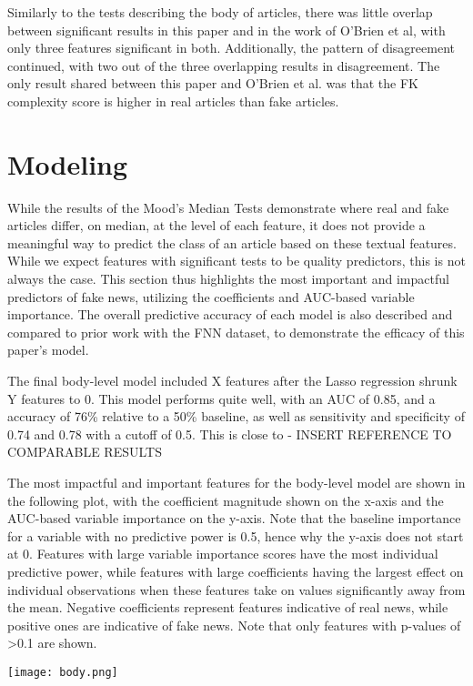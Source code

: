 \documentclass[../thesis.tex]{subfiles}
\begin{document}
Similarly to the tests describing the body of articles, there was little overlap between significant results in this paper and in the work of O'Brien et al, with only three features significant in both. Additionally, the pattern of disagreement continued, with two out of the three overlapping results in disagreement. The only result shared between this paper and O'Brien et al. was that the FK complexity score is higher in real articles than fake articles.

\section{Modeling}

While the results of the Mood's Median Tests demonstrate where real and fake articles differ, on median, at the level of each feature, it does not provide a meaningful way to predict the class of an article based on these textual features. While we expect features with significant tests to be quality predictors, this is not always the case. This section thus highlights the most important and impactful predictors of fake news, utilizing the coefficients and AUC-based variable importance. The overall predictive accuracy of each model is also described and compared to prior work with the FNN dataset, to demonstrate the efficacy of this paper's model.

The final body-level model included X features after the Lasso regression shrunk Y features to 0. This model performs quite well, with an AUC of 0.85, and a accuracy of 76\% relative to a 50\% baseline, as well as sensitivity and specificity of 0.74 and 0.78 with a cutoff of 0.5. This is close to - INSERT REFERENCE TO COMPARABLE RESULTS

The most impactful and important features for the body-level model are shown in the following plot, with the coefficient magnitude shown on the x-axis and the AUC-based variable importance on the y-axis. Note that the baseline importance for a variable with no predictive power is 0.5, hence why the y-axis does not start at 0. Features with large variable importance scores have the most individual predictive power, while features with large coefficients having the largest effect on individual observations when these features take on values significantly away from the mean. Negative coefficients represent features indicative of real news, while positive ones are indicative of fake news. Note that only features with p-values of >0.1 are shown.

\texttt{[image: body.png]}
\end{document}
